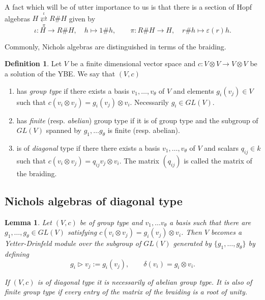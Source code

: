 \documentclass{amsart}
\newtheorem{lemma}{Lemma}
\theoremstyle{definition}
\newtheorem{definition}{Definition}
\begin{document}
	A fact which will be of utter importance to us is that there is a section of Hopf algebras 
	$H\overset{\iota}{\underset{\pi}{\rightleftarrows}} R\#H$ given by
	$$
	\iota:H \rightarrow R\#H, \quad h \mapsto 1\#h, \qquad \pi: R\#H\rightarrow H, \quad r\#h \mapsto \varepsilon(r)h.
	$$
	
	Commonly, Nichols algebras are distinguished in terms of the braiding.
	
	\begin{definition}
		Let $V$ be a finite dimensional vector space and $c: V\otimes V \rightarrow V \otimes V$ be a solution of the YBE. We say that $(V,c)$
		\begin{enumerate}
			\item has \emph{group type} if there exists a basis $v_1, \dotsc, v_\theta$ of $V$ and elements $g_i(v_j)\in V$ such that
			$
			c(v_i \otimes v_j) = g_i(v_j) \otimes v_i.
			$
			Necessarily $g_i \in GL(V)$.
			\item has \emph{finite} (resp. \emph{abelian}) group type if it is of group type and the subgroup of $GL(V)$ spanned by $g_1,\dotsc g_\theta$ is finite (resp. abelian).
			\item is of \emph{diagonal} type if there there exists a basis $v_1, \dotsc, v_\theta$ of $V$ and scalars $q_{ij} \in k$ such that
			$
			c(v_i \otimes v_j) = q_{ij} v_j \otimes v_i.
			$
			The matrix $(q_{ij})$ is called the matrix of the braiding.
		\end{enumerate}
	\end{definition}

	\subsection{Nichols algebras of diagonal type}
	
	\begin{lemma}
		Let $(V,c)$ be of group type and $v_1,\dotsc v_\theta$ a basis such that there are $g_1,\dotsc, g_\theta \in GL(V)$ satisfying $c(v_i\otimes v_j) = g_i(v_j) \otimes v_i$. 
		Then $V$ becomes a Yetter-Drinfeld module over the subgroup of $GL(V)$ generated by $\{ g_1, \dotsc, g_\theta \}$ 
		by defining
		$$
		g_i \triangleright v_j := g_i(v_j), \qquad \delta(v_i)= g_i \otimes v_i.
		$$ 
		
		If $(V,c)$ is of diagonal type it is necessarily of abelian group type.
		It is also of finite group type if every entry of the matrix of the braiding is a root of unity.
	\end{lemma}
	
\end{document}
